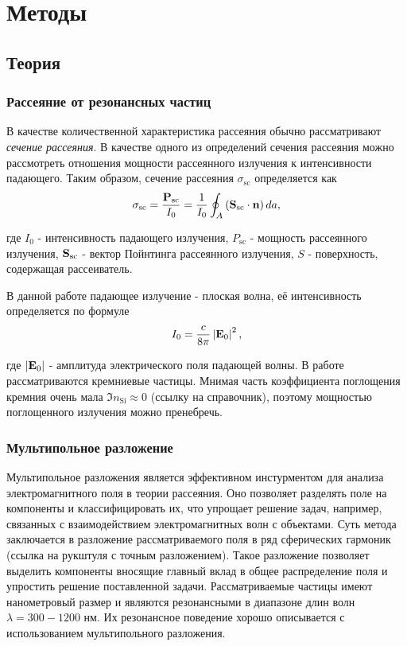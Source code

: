 \chapter{Методы}


\section{Теория}\label{sec:theory}

\subsection{Рассеяние от резонансных частиц}\label{subsec:scat_cs}

В качестве количественной характеристика рассеяния обычно рассматривают \textit{сечение рассеяния}. В качестве одного из определений сечения рассеяния можно рассмотреть отношения мощности рассеянного излучения к интенсивности падающего. Таким образом, сечение рассеяния $\sigma_{\text{sc}}$ определяется как
\begin{equation}
    \sigma_{\text{sc}} = \frac{\vb{P_{\text{sc}}}}{I_0} = \frac{1}{I_0} \oint_A  \left(  \mathbf{S}_{\text{sc}} \cdot \vb{n} \right) da,
\end{equation}

где $I_0$ - интенсивность падающего излучения, $P_{\text{sc}}$ - мощность рассеянного излучения, $\vb{S}_{\text{sc}}$ - вектор Пойнтинга рассеянного излучения, $S$ - поверхность, содержащая рассеиватель.

В данной работе падающее излучение - плоская волна, её интенсивность определяется по формуле
\begin{equation}
    I_0 = \frac{c}{8\pi} \left| \vb{E}_0 \right|^2,
\end{equation}

где $\left| \vb{E}_0 \right|$ - амплитуда электрического поля падающей волны.
В работе рассматриваются кремниевые частицы. Мнимая часть коэффициента поглощения кремния очень мала $\Im{n_{\text{Si}}} \approx 0$ (ссылку на справочник), поэтому мощностью поглощенного излучения можно пренебречь. 

\subsection{Мультипольное разложение}\label{subsec:mult_decomp}

Мультипольное разложения является эффективном инстурментом для анализа электромагнитного поля в теории рассеяния. Оно позволяет разделять поле на компоненты и классифицировать их, что упрощает решение задач, например, связанных с взаимодействием электромагнитных волн с объектами. Суть метода заключается в разложение рассматриваемого поля в ряд сферических гармоник (ссылка на  рукштуля с точным разложением). Такое разложение позволяет выделить компоненты вносящие главный вклад в общее распределение поля и упростить решение поставленной задачи.
Рассматриваемые частицы имеют нанометровый размер и являются резонансными в диапазоне длин волн $\lambda = 300-1200$ нм. Их резонансное поведение хорошо описывается с использованием мультипольного разложения. 

